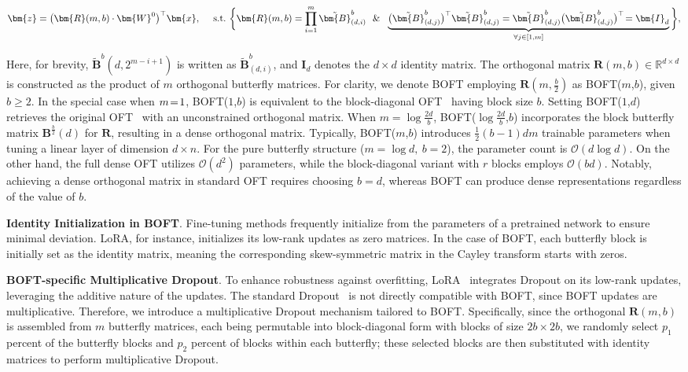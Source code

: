 \begin{equation}
    \begin{aligned}\nonumber
    \bm{z}=\big(\bm{R}(m,b)\cdot\bm{W}^0\big)^\top\bm{x},~~~~\text{s.t.}~\bigg{\{}\bm{R}(m,b)=\prod_{i=1}^m \tilde{\bm{B}}^b_{(d,i)}~~\&~~\underbrace{\big(\tilde{\bm{B}}^b_{(d,j)}\big)^\top\tilde{\bm{B}}^b_{(d,j)}=\tilde{\bm{B}}^b_{(d,j)}\big(\tilde{\bm{B}}^b_{(d,j)}\big)^\top\!=\bm{I}_d}_{\forall j\in [1, m]}\bigg{\}},
    \end{aligned}
\end{equation}

Here, for brevity, $\tilde{\bm{B}}^b(d,2^{m - i+1})$ is written as $\tilde{\bm{B}}^b_{(d,i)}$, and $\bm{I}_d$ denotes the $d \times d$ identity matrix. The orthogonal matrix $\bm{R}(m,b)\in\mathbb{R}^{d\times d}$ is constructed as the product of $m$ orthogonal butterfly matrices. For clarity, we denote BOFT employing $\bm{R}(m,\frac{b}{2})$ as BOFT($m$,$b$), given $b\geq 2$. In the special case when $\thickmuskip=2mu \medmuskip=2mu m=1$, BOFT($1$,$b$) is equivalent to the block-diagonal OFT~\cite{qiu2023controlling} having block size $b$. Setting BOFT($1$,$d$) retrieves the original OFT~\cite{qiu2023controlling} with an unconstrained orthogonal matrix. When $m=\log \frac{2d}{b}$, BOFT($\log \frac{2d}{b}$,$b$) incorporates the block butterfly matrix $\bm{B}^{\frac{b}{2}}(d)$ for $\bm{R}$, resulting in a dense orthogonal matrix. Typically, BOFT($m$,$b$) introduces $\frac{1}{2}(b-1)dm$ trainable parameters when tuning a linear layer of dimension $d\times n$. For the pure butterfly structure ($m=\log d,~b=2$), the parameter count is $\mathcal{O}(d\log d)$. On the other hand, the full dense OFT utilizes $\mathcal{O}(d^2)$ parameters, while the block-diagonal variant with $r$ blocks employs $\mathcal{O}(bd)$. Notably, achieving a dense orthogonal matrix in standard OFT requires choosing $b=d$, whereas BOFT can produce dense representations regardless of the value of $b$.

\textbf{Identity Initialization in BOFT}. Fine-tuning methods frequently initialize from the parameters of a pretrained network to ensure minimal deviation. LoRA, for instance, initializes its low-rank updates as zero matrices. In the case of BOFT, each butterfly block is initially set as the identity matrix, meaning the corresponding skew-symmetric matrix in the Cayley transform starts with zeros.

\textbf{BOFT-specific Multiplicative Dropout}. To enhance robustness against overfitting, LoRA~\cite{hulora2022} integrates Dropout on its low-rank updates, leveraging the additive nature of the updates. The standard Dropout~\cite{srivastava2014dropout} is not directly compatible with BOFT, since BOFT updates are multiplicative. Therefore, we introduce a multiplicative Dropout mechanism tailored to BOFT. Specifically, since the orthogonal $\bm{R}(m,b)$ is assembled from $m$ butterfly matrices, each being permutable into block-diagonal form with blocks of size $2b\times 2b$, we randomly select $p_1$ percent of the butterfly blocks and $p_2$ percent of blocks within each butterfly; these selected blocks are then substituted with identity matrices to perform multiplicative Dropout.

